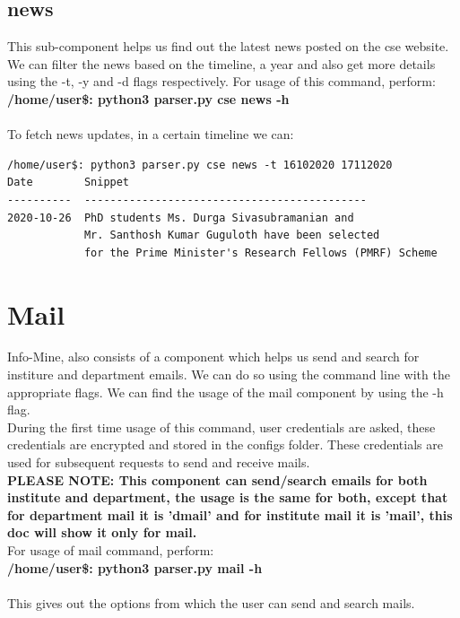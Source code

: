 \documentclass[12pt, letterpaper, twoside]{article}
\begin{document}
\subsection{news}
This sub-component helps us find out the latest news posted on the cse website.
We can filter the news based on the timeline, a year and also get more details using the -t, -y and -d flags respectively.
For usage of this command, perform:\\
\textbf{/home/user\$: python3 parser.py cse news -h}\\
\\
To fetch news updates, in a certain timeline we can:
\begin{verbatim}
/home/user$: python3 parser.py cse news -t 16102020 17112020
Date        Snippet
----------  --------------------------------------------
2020-10-26  PhD students Ms. Durga Sivasubramanian and 
            Mr. Santhosh Kumar Guguloth have been selected 
            for the Prime Minister's Research Fellows (PMRF) Scheme

\end{verbatim}
\section{Mail}
Info-Mine, also consists of a component which helps us send and search for institure and department emails. We can do so using the command line with the appropriate flags. We can find the usage of the mail component by using the -h flag.\\
During the first time usage of this command, user credentials are asked, these credentials are encrypted and stored in the configs folder. These credentials are used for subsequent requests to send and receive mails.\\
\textbf{PLEASE NOTE: This component can send/search emails for both institute and department, the usage is the same for both, except that for department mail it is 'dmail' and for institute mail it is 'mail', this doc will show it only for mail.}\\
For usage of mail command, perform:\\
\textbf{/home/user\$: python3 parser.py mail -h}\\
\\
This gives out the options from which the user can send and search mails.
\end{document}
